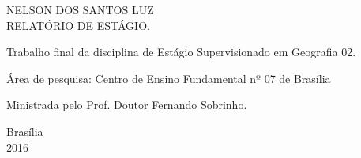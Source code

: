 \begin{titlepage}
\vfill
\begin{center}

    {\large NELSON DOS SANTOS LUZ\\}
    \vspace{2cm}
    {\Large \textsc{RELATÓRIO DE ESTÁGIO.}\\}
    \vspace{1cm}
    \hspace{.45\linewidth}
    \begin{minipage}{.50\linewidth}

            Trabalho final da disciplina de Estágio Supervisionado em Geografia 02. 

            \vspace{0.5 cm}

            Área de pesquisa: Centro de Ensino Fundamental nº 07 de Brasília

            \vspace{0.5 cm}

            Ministrada pelo Prof. Doutor Fernando Sobrinho.
    
    \end{minipage}

    \vspace{2cm}
    \vfill
    {\large Brasília\\ 2016}
\end{center}

\end{titlepage}
